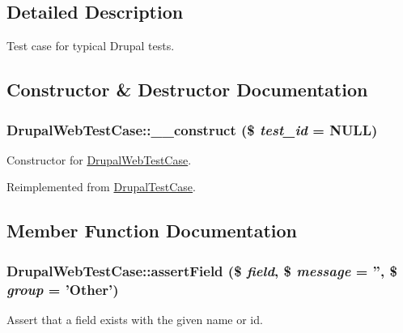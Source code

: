 \subsection{Detailed Description}
Test case for typical Drupal tests. 

\subsection{Constructor \& Destructor Documentation}
\hypertarget{class_drupal_web_test_case_a76d165c12dc6042bae017b5c521e6ffa}{
\subsubsection[{\_\-\_\-construct}]{\setlength{\rightskip}{0pt plus 5cm}DrupalWebTestCase::\_\-\_\-construct (\$ {\em test\_\-id} = {\ttfamily NULL})}}
\label{class_drupal_web_test_case_a76d165c12dc6042bae017b5c521e6ffa}
Constructor for \hyperlink{class_drupal_web_test_case}{DrupalWebTestCase}. 

Reimplemented from \hyperlink{class_drupal_test_case_abb2516192da25b89bec5f5a4a7e91aab}{DrupalTestCase}.

\subsection{Member Function Documentation}
\hypertarget{class_drupal_web_test_case_a3955b3b90e4688bbd6f8fa0c5b47bfbe}{
\subsubsection[{assertField}]{\setlength{\rightskip}{0pt plus 5cm}DrupalWebTestCase::assertField (\$ {\em field}, \/  \$ {\em message} = {\ttfamily ''}, \/  \$ {\em group} = {\ttfamily 'Other'})}}
\label{class_drupal_web_test_case_a3955b3b90e4688bbd6f8fa0c5b47bfbe}
Assert that a field exists with the given name or id.


